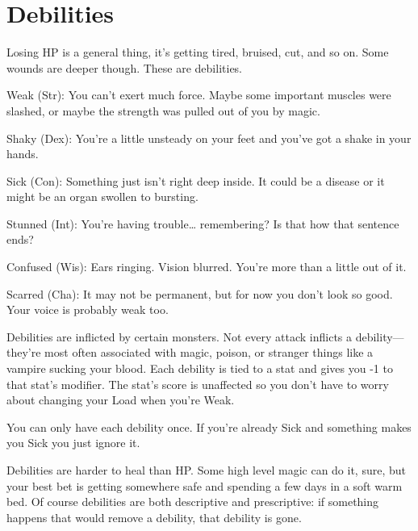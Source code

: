  
\section{Debilities}   
 

Losing HP is a general thing, it's getting tired, bruised, cut, and so on. Some wounds are deeper though. These are debilities.

 
\startitemize[1,packed]

\item Weak (Str): You can't exert much force. Maybe some important muscles were slashed, or maybe the strength was pulled out of you by magic.

 
\item Shaky (Dex): You're a little unsteady on your feet and you've got a shake in your hands.

 
\item Sick (Con): Something just isn't right deep inside. It could be a disease or it might be an organ swollen to bursting.

 
\item Stunned (Int): You're having trouble… remembering? Is that how that sentence ends?

 
\item Confused (Wis): Ears ringing. Vision blurred. You're more than a little out of it.

 
\item Scarred (Cha): It may not be permanent, but for now you don't look so good. Your voice is probably weak too.


\stopitemize
 

Debilities are inflicted by certain monsters. Not every attack inflicts a debility—they're most often associated with magic, poison, or stranger things like a vampire sucking your blood. Each debility is tied to a stat and gives you -1 to that stat's modifier. The stat's score is unaffected so you don't have to worry about changing your Load when you're Weak.

 

You can only have each debility once. If you're already Sick and something makes you Sick you just ignore it.

 

Debilities are harder to heal than HP. Some high level magic can do it, sure, but your best bet is getting somewhere safe and spending a few days in a soft warm bed. Of course debilities are both descriptive and prescriptive: if something happens that would remove a debility, that debility is gone.

